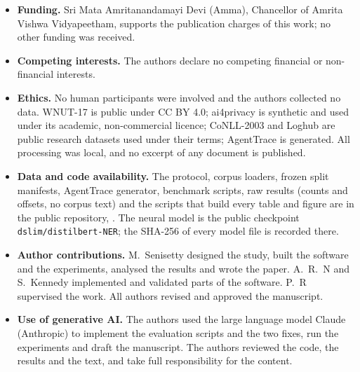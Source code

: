 \begin{itemize}
\ifanonymous\else
\item \textbf{Funding.} Sri Mata Amritanandamayi Devi (Amma), Chancellor of Amrita Vishwa Vidyapeetham, supports the publication charges of this work; no other funding was received.
\fi
\item \textbf{Competing interests.} The authors declare no competing financial or non-financial interests.
\item \textbf{Ethics.} No human participants were involved and the authors collected no data. WNUT-17 is public under CC BY 4.0; ai4privacy is synthetic and used under its academic, non-commercial licence; CoNLL-2003 and Loghub are public research datasets used under their terms; AgentTrace is generated. All processing was local, and no excerpt of any document is published.
\item \textbf{Data and code availability.} The protocol, corpus loaders, frozen split manifests, AgentTrace generator, benchmark scripts, raw results (counts and offsets, no corpus text) and the scripts that build every table and figure are in the public repository, \repolink{}. The neural model is the public checkpoint \texttt{dslim/distilbert-NER}; the SHA-256 of every model file is recorded there.
\ifanonymous\else
\item \textbf{Author contributions.} M.~Senisetty designed the study, built the software and the experiments, analysed the results and wrote the paper. A.~R.~N and S.~Kennedy implemented and validated parts of the software. P.~R supervised the work. All authors revised and approved the manuscript.
\fi
\item \textbf{Use of generative AI.} The authors used the large language model Claude (Anthropic) to implement the evaluation scripts and the two fixes, run the experiments and draft the manuscript. The authors reviewed the code, the results and the text, and take full responsibility for the content.
\end{itemize}
